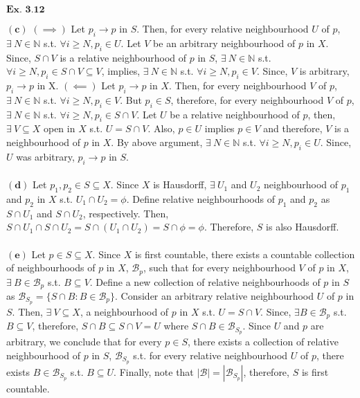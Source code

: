 \documentclass{article}
\begin{document}
\vspace{0.2in}

${\textbf{Ex. 3.12}}$

$\mathbf{(c)}$ $(\implies)$ Let $p_i \rightarrow p$ in $S$. Then, for every relative neighbourhood $U$ of $p$, $\exists\ N \in \mathbb{N}$ s.t. $\forall i \geq N, p_i \in U$. Let $V$ be an arbitrary neighbourhood of $p$ in $X$. Since, $S \cap V$ is a relative neighbourhood of $p$ in $S$, $\exists\ N \in \mathbb{N}$ s.t. $\forall i \geq N, p_i \in S\cap V \subseteq V$, implies, $\exists\ N \in \mathbb{N}$ s.t. $\forall i \geq N, p_i \in V$. Since, $V$ is arbitrary, $p_i \rightarrow p$ in X. $(\impliedby)$ Let $p_i \rightarrow p$ in $X$. Then, for every neighbourhood $V$ of $p$, $\exists\ N \in \mathbb{N}$ s.t. $\forall i \geq N, p_i \in V$. But $p_i \in S$, therefore, for every neighbourhood $V$ of $p$, $\exists\ N \in \mathbb{N}$ s.t. $\forall i \geq N, p_i \in S\cap V$. Let $U$ be a relative neighbourhood of $p$, then, $\exists\ V \subseteq X$ open in $X$ s.t. $U = S \cap V$. Also, $p \in U$ implies $p \in V$ and therefore, $V$ is a neighbourhood of $p$ in $X$. By above argument, $\exists\ N \in \mathbb{N}$ s.t. $\forall i \geq N, p_i \in U$. Since, $U$ was arbitrary, $p_i \rightarrow p$ in $S$.\\~\\

$\mathbf{(d)}$ Let $p_1, p_2 \in S \subseteq X$. Since $X$ is Hausdorff, $\exists\ U_1$ and  $U_2$ neighbourhood of $p_1$ and $p_2$ in $X$ s.t. $U_1 \cap U_2 = \phi$. Define relative neighbourhoods of $p_1$ and $p_2$ as $S\cap U_1$ and $S \cap U_2$, respectively. Then, $S\cap U_1\cap S \cap U_2 = S \cap (U_1\cap U_2) = S\cap\phi = \phi$. Therefore, $S$ is also Hausdorff.\\~\\

$\mathbf{(e)}$ Let $p \in S \subseteq X$. Since $X$ is first countable, there exists a countable collection of neighbourhoods of $p$ in $X$, $\mathcal{B}_p$, such that for every neighbourhood $V$ of $p$ in $X$, $\exists\ B \in \mathcal{B}_p$ s.t. $B \subseteq V$. Define a new collection of relative neighbourhoods of $p$ in $S$ as $\mathcal{B}_{S_p} = \{S\cap B: B \in \mathcal{B}_{p}\}$. Consider an arbitrary relative neighbourhood $U$ of $p$ in $S$. Then, $\exists\ V \subseteq X$, a neighbourhood of $p$ in $X$ s.t. $U = S \cap V$. Since, $\exists B \in \mathcal{B}_p$ s.t. $B \subseteq V$, therefore, $S \cap B \subseteq S \cap V = U$ where $S \cap B \in \mathcal{B}_{S_p}$. Since $U$ and $p$ are arbitrary, we conclude that for every $p \in S$, there exists a collection of relative neighbourhood of $p$ in $S$, $\mathcal{B}_{S_p}$ s.t. for every relative neighbourhood $U$ of $p$, there exists $B \in \mathcal{B}_{S_p}$ s.t. $B \subseteq U$. Finally, note that $|\mathcal{B}| = |\mathcal{B}_{S_p}|$, therefore, $S$ is first countable.\\~\\
\end{document}
